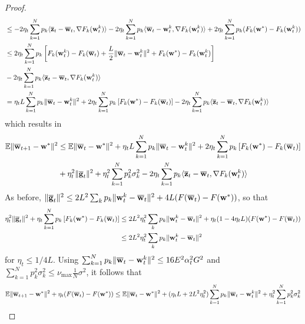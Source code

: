 \begin{proof}
\begin{align*}
	& \leq-2\eta_{t}\sum_{k=1}^{N}p_{k}\langle{\overline{\mathbf{z}}}_{t}-{\overline{\mathbf{w}}}_{t},\nabla F_{k}({\mathbf{w}}_{t}^{k})\rangle-2\eta_{t}\sum_{k=1}^{N}p_{k}\langle{\overline{\mathbf{w}}}_{t}-{\mathbf{w}}_{t}^{k},\nabla F_{k}({\mathbf{w}}_{t}^{k})\rangle+2\eta_{t}\sum_{k=1}^{N}p_{k}(F_{k}({\mathbf{w}}^{\ast})-F_{k}({\mathbf{w}}_{t}^{k}))\\
	& \leq2\eta_{t}\sum_{k=1}^{N}p_{k}\left[F_{k}({\mathbf{w}}_{t}^{k})-F_{k}({\overline{\mathbf{w}}}_{t})+\frac{L}{2}\|{\overline{\mathbf{w}}}_{t}-{\mathbf{w}}_{t}^{k}\|^{2}+F_{k}({\mathbf{w}}^{\ast})-F_{k}({\mathbf{w}}_{t}^{k})\right]\\
	& -2\eta_{t}\sum_{k=1}^{N}p_{k}\langle{\overline{\mathbf{z}}}_{t}-{\overline{\mathbf{w}}}_{t},\nabla F_{k}({\mathbf{w}}_{t}^{k})\rangle\\
	& =\eta_{t}L\sum_{k=1}^{N}p_{k}\|{\overline{\mathbf{w}}}_{t}-{\mathbf{w}}_{t}^{k}\|^{2}+2\eta_{t}\sum_{k=1}^{N}p_{k}\left[F_{k}({\mathbf{w}}^{\ast})-F_{k}({\overline{\mathbf{w}}}_{t})\right]-2\eta_{t}\sum_{k=1}^{N}p_{k}\langle{\overline{\mathbf{z}}}_{t}-{\overline{\mathbf{w}}}_{t},\nabla F_{k}({\mathbf{w}}_{t}^{k})\rangle
	\end{align*}
	which results in 
	\begin{align*}
	\mathbb{E}\|{\overline{\mathbf{w}}}_{t+1}-{\mathbf{w}}^{\ast}\|^{2} & \leq\mathbb{E}\|{\overline{\mathbf{w}}}_{t}-{\mathbf{w}}^{\ast}\|^{2}+\eta_{t}L\sum_{k=1}^{N}p_{k}\|{\overline{\mathbf{w}}}_{t}-{\mathbf{w}}_{t}^{k}\|^{2}+2\eta_{t}\sum_{k=1}^{N}p_{k}\left[F_{k}({\mathbf{w}}^{\ast})-F_{k}({\overline{\mathbf{w}}}_{t})\right]\\
	& +\eta_{t}^{2}\|{\overline{\mathbf{g}}}_{t}\|^{2}+\eta_{t}^{2}\sum_{k=1}^{N}p_{k}^{2}\sigma_{k}^{2}-2\eta_{t}\sum_{k=1}^{N}p_{k}\langle{\overline{\mathbf{z}}}_{t}-{\overline{\mathbf{w}}}_{t},\nabla F_{k}({\mathbf{w}}_{t}^{k})\rangle
	\end{align*}
	As before, $\|{\overline{\mathbf{g}}}_{t}\|^{2}\leq2L^{2}\sum_{k}p_{k}\|{\mathbf{w}}_{t}^{k}-{\overline{\mathbf{w}}}_{t}\|^{2}+4L(F({\overline{\mathbf{w}}}_{t})-F({\mathbf{w}}^{\ast}))$,
	so that 
	\begin{align*}
	\eta_{t}^{2}\|{\overline{\mathbf{g}}}_{t}\|^{2}+\eta_{t}\sum_{k=1}^{N}p_{k}\left[F_{k}({\mathbf{w}}^{\ast})-F_{k}({\overline{\mathbf{w}}}_{t})\right] & \leq2L^{2}\eta_{t}^{2}\sum_{k}p_{k}\|{\mathbf{w}}_{t}^{k}-{\overline{\mathbf{w}}}_{t}\|^{2}+\eta_{t}(1-4\eta_{t}L)(F({\mathbf{w}}^{\ast})-F({\overline{\mathbf{w}}}_{t}))\\
	& \leq2L^{2}\eta_{t}^{2}\sum_{k}p_{k}\|{\mathbf{w}}_{t}^{k}-{\overline{\mathbf{w}}}_{t}\|^{2}
	\end{align*}
	for $\eta_{t}\le1/4L$. Using $\sum_{k=1}^{N}p_{k}\|{\overline{\mathbf{w}}}_{t}-{\mathbf{w}}_{t}^{k}\|^{2}\leq16E^{2}\alpha_{t}^{2}G^{2}$
	and $\sum_{k=1}^{N}p_{k}^{2}\sigma_{k}^{2}\leq\nu_{\max}\frac{1}{N}\sigma^{2}$,
	it follows that 
	\begin{align*}
	\mathbb{E}\|\ov{w}_{t+1}-\vw^{\ast}\|^{2}+\eta_{t}(F(\ov{w}_{t})-F(\vw^{\ast})) & \leq\mathbb{E}\|\ov{w}_{t}-\vw^{\ast}\|^{2}+(\eta_{t}L+2L^{2}\eta_{t}^{2})\sum_{k=1}^{N}p_{k}\|\ov{w}_{t}-\vw_{t}^{k}\|^{2}+\eta_{t}^{2}\sum_{k=1}^{N}p_{k}^{2}\sigma_{k}^{2}\\

\end{align*}
\end{proof}
